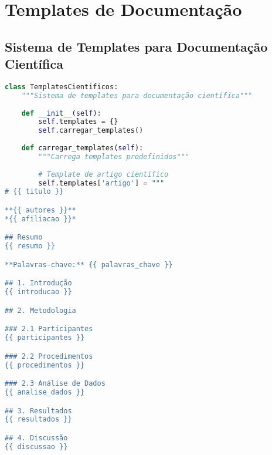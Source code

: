 \section{Templates de Documentação}

\subsection{Sistema de Templates para Documentação Científica}

\begin{pythonbox}
\begin{lstlisting}[language=Python]
class TemplatesCientificos:
    """Sistema de templates para documentação científica"""
    
    def __init__(self):
        self.templates = {}
        self.carregar_templates()
    
    def carregar_templates(self):
        """Carrega templates predefinidos"""
        
        # Template de artigo científico
        self.templates['artigo'] = """
# {{ titulo }}

**{{ autores }}**  
*{{ afiliacao }}*

## Resumo
{{ resumo }}

**Palavras-chave:** {{ palavras_chave }}

## 1. Introdução
{{ introducao }}

## 2. Metodologia

### 2.1 Participantes
{{ participantes }}

### 2.2 Procedimentos
{{ procedimentos }}

### 2.3 Análise de Dados
{{ analise_dados }}

## 3. Resultados
{{ resultados }}

## 4. Discussão
{{ discussao }}
   \end{lstlisting}
\end{pythonbox}

